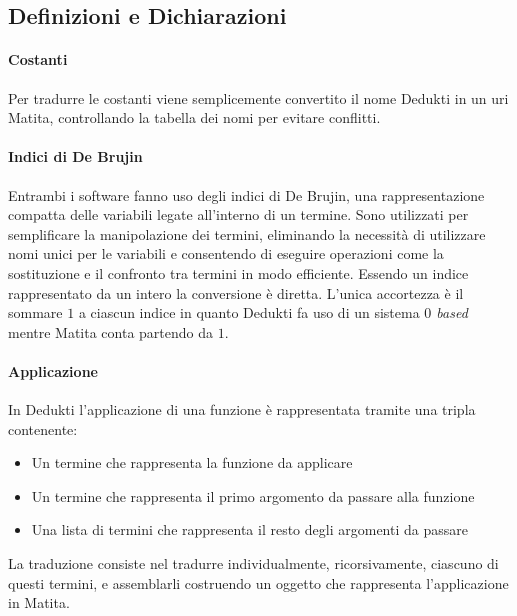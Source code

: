 \documentclass[12pt,a4paper]{mimosis}
\begin{document}
\subsection{Definizioni e Dichiarazioni}

\paragraph{Costanti}
Per tradurre le costanti viene semplicemente convertito il nome Dedukti in un 
uri Matita, controllando la tabella dei nomi per evitare conflitti.

\paragraph{Indici di De Brujin}
Entrambi i software fanno uso degli indici di De Brujin, una rappresentazione
compatta delle variabili legate all'interno di un termine. Sono utilizzati per
semplificare la manipolazione dei termini, eliminando la necessità di utilizzare
nomi unici per le variabili e consentendo di eseguire operazioni come la 
sostituzione e il confronto tra termini in modo efficiente. 
Essendo un indice rappresentato da un intero la conversione è diretta.
L'unica accortezza è il sommare $1$ a ciascun indice in quanto
Dedukti fa uso di un sistema \textit{$0$ based} mentre Matita conta partendo
da $1$.

\paragraph{Applicazione}
In Dedukti l'applicazione di una funzione è rappresentata tramite una tripla
contenente: 
\begin{itemize}
  \item Un termine che rappresenta la funzione da applicare
  \item Un termine che rappresenta il primo argomento da passare alla funzione
  \item Una lista di termini che rappresenta il resto degli argomenti da passare
\end{itemize}

La traduzione consiste nel tradurre individualmente, ricorsivamente, ciascuno
di questi termini, e assemblarli costruendo un oggetto che rappresenta l'applicazione
in Matita. 
\end{document}
